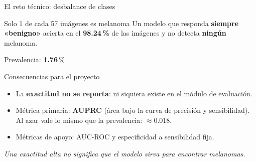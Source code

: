 \documentclass[aspectratio=169,10pt]{beamer}
\begin{document}
\begin{frame}{El reto técnico: desbalance de clases}
  \begin{alertblock}{Solo 1 de cada 57 imágenes es melanoma}
    Un modelo que responda \textbf{siempre «benigno»} acierta en el \textbf{98.24\,\%} de las imágenes y no detecta \textbf{ningún} melanoma.
  \end{alertblock}
  \vspace{0.6em}
  \begin{center}
    {\Large Prevalencia: \textbf{1.76}\,\%}
  \end{center}
  \vspace{0.6em}
  \begin{block}{Consecuencias para el proyecto}
    \begin{itemize}
      \item La \textbf{exactitud no se reporta}: ni siquiera existe en el módulo de evaluación.
      \item Métrica primaria: \textbf{AUPRC} (área bajo la curva de precisión y sensibilidad). Al azar vale lo mismo que la prevalencia: $\approx 0.018$.
      \item Métricas de apoyo: AUC-ROC y especificidad a sensibilidad fija.
    \end{itemize}
  \end{block}
  \vspace{0.4em}
  \begin{center}
    \textit{Una exactitud alta no significa que el modelo sirva para encontrar melanomas.}
  \end{center}
\end{frame}
\end{document}
